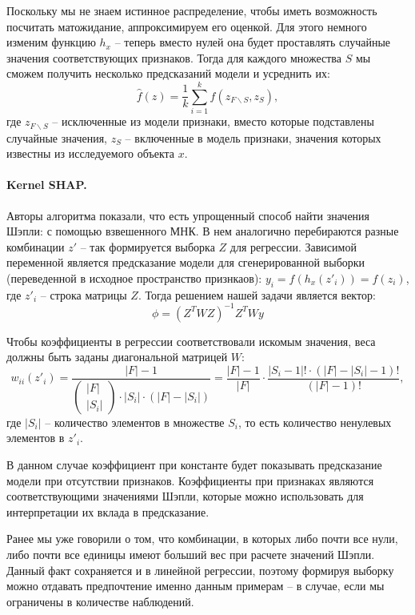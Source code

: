 Поскольку мы не знаем истинное распределение, чтобы иметь возможность посчитать матожидание, аппроксимируем его оценкой. Для этого немного изменим функцию $h_x$ -- теперь вместо нулей она будет проставлять случайные значения соответствующих признаков. Тогда для каждого множества $S$ мы сможем получить несколько предсказаний модели и усреднить их:
\[
\hat{f}(z) = \frac{1}{k} \sum\limits_{i=1}^k f(z_{F\backslash S}, z_S),
\]
где $z_{F\backslash S}$ -- исключенные из модели признаки, вместо которые подставлены случайные значения, $z_S$ -- включенные в модель признаки, значения которых известны из исследуемого объекта $x$.
\paragraph{Kernel SHAP.}%
Авторы алгоритма показали, что есть упрощенный способ найти значения Шэпли: %
с помощью взвешенного МНК. В нем аналогично перебираются разные комбинации $z'$ -- так формируется выборка $Z$ для регрессии. Зависимой переменной является предсказание модели для сгенерированной выборки (переведенной в исходное пространство признкаов): $y_i = f(h_x(z'_i)) = f(z_i)$, где $z'_i$ -- строка матрицы $Z$. Тогда решением нашей задачи является вектор: \[
\phi = (Z^T W Z)^{-1} Z^T W y
\] %

Чтобы коэффициенты в регрессии соответствовали искомым значения, веса должны быть заданы диагональной матрицей $W$: 
\[w_{ii}(z'_i) = \frac{|F|-1}{
	\begin{pmatrix}
	|F| \\
	|S_i|
	\end{pmatrix} \cdot |S_i| \cdot (|F| - |S_i|)} = \frac{|F|-1}{|F|} \cdot \frac{|S_i - 1|! \cdot (|F|-|S_i|-1)!}{(|F|-1)!},
\]
где $|S_i|$ -- количество элементов в множестве $S_i$, то есть количество ненулевых элементов в $z'_i$.

В данном случае коэффициент при константе будет показывать предсказание модели при отсутствии признаков. Коэффициенты при признаках являются соответствующими значениями Шэпли, %
которые можно использовать для интерпретации их вклада в предсказание.

Ранее мы уже говорили о том, что комбинации, в которых либо почти все нули, либо почти все единицы имеют больший вес при расчете значений Шэпли. Данный факт сохраняется и в линейной регрессии, поэтому формируя выборку можно отдавать предпочтение именно данным примерам -- в случае, если мы ограничены в количестве наблюдений.

